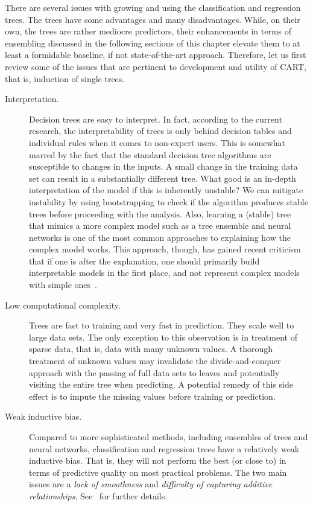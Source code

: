 \begin{refsection}
There are several issues with growing and using the classification and regression trees. The trees have some advantages and many disadvantages. While, on their own, the trees are rather mediocre predictors, their enhancements in terms of ensembling discussed in the following sections of this chapter elevate them to at least a formidable baseline, if not state-of-the-art approach. Therefore, let us first review some of the issues that are pertinent to development and utility of CART, that is, induction of single trees.

\begin{description}
\item[Interpretation.] Decision trees are easy to interpret. In fact, according to the current research, the interpretability of trees is only behind decision tables and individual rules when it comes to non-expert users. This is somewhat marred by the fact that the standard decision tree algorithms are susceptible to changes in the inputs. A small change in the training data set can result in a substantially different tree. What good is an in-depth interpretation of the model if this is inherently unstable? We can mitigate instability by using bootstrapping to check if the algorithm produces stable trees before proceeding with the analysis. Also, learning a (stable) tree that mimics a more complex model such as a tree ensemble and neural networks is one of the most common approaches to explaining how the complex model works. This approach, though, has gained recent criticism that if one is after the explanation, one should primarily build interpretable models in the first place, and not represent complex models with simple ones~\citep{Rudin2019}.

\item[Low computational complexity.] Trees are fast to training and very fast in prediction. They scale well to large data sets. The only exception to this observation is in treatment of sparse data, that is, data with many unknown values. A thorough treatment of unknown values may invalidate the divide-and-conquer approach with the passing of full data sets to leaves and potentially visiting the entire tree when predicting. A potential remedy of this side effect is to impute the missing values before training or prediction.

\item[Weak inductive bias.] Compared to more sophisticated methods, including ensembles of trees and neural networks, classification and regression trees have a relatively weak inductive bias. That is, they will not perform the best (or close to) in terms of predictive quality on most practical problems. The two main issues are a {\em lack of smoothness} and {\em difficulty of capturing additive relationships}. See~\citep{ESL} for further details.


\end{description}
\end{refsection}
